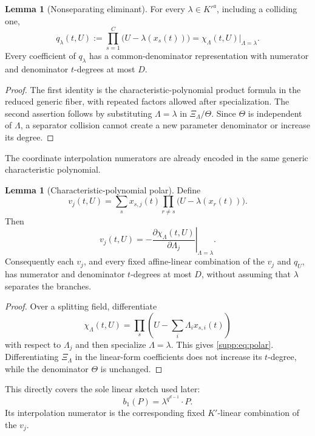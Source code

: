 \documentclass[11pt,a4paper]{article}
\theoremstyle{definition}
\newtheorem{lemma}[theorem]{Lemma}
\theoremstyle{remark}
\begin{document}
\begin{lemma}[Nonseparating eliminant]\label{supp:lem:charpoly}
For every $\lambda\in K'^a$, including a colliding one,
\[
 q_\lambda(t,U)
 :=\prod_{s=1}^{C}\bigl(U-\lambda(x_s(t))\bigr)
 =\chi_\Lambda(t,U)\big|_{\Lambda=\lambda}.
\]
Every coefficient of $q_\lambda$ has a common-denominator representation with numerator and denominator $t$-degrees at most $D$.
\end{lemma}

\begin{proof}
The first identity is the characteristic-polynomial product formula in the reduced generic fiber, with repeated factors allowed after specialization.  The second assertion follows by substituting $\Lambda=\lambda$ in $\Xi_\Lambda/\Theta$.  Since $\Theta$ is independent of $\Lambda$, a separator collision cannot create a new parameter denominator or increase its degree.
\end{proof}

The coordinate interpolation numerators are already encoded in the same generic characteristic polynomial.

\begin{lemma}[Characteristic-polynomial polar]\label{supp:lem:polar}
Define
\[
 v_j(t,U)=\sum_s x_{s,j}(t)
       \prod_{r\ne s}\bigl(U-\lambda(x_r(t))\bigr).
\]
Then
\begin{equation}\label{supp:eq:polar}
 v_j(t,U)
 =-\left.\frac{\partial\chi_\Lambda(t,U)}{\partial\Lambda_j}
   \right|_{\Lambda=\lambda}.
\end{equation}
Consequently each $v_j$, and every fixed affine-linear combination of the $v_j$ and $q_U$, has numerator and denominator $t$-degrees at most $D$, without assuming that $\lambda$ separates the branches.
\end{lemma}

\begin{proof}
Over a splitting field, differentiate
\[
 \chi_\Lambda(t,U)=\prod_s\left(U-\sum_i\Lambda_i x_{s,i}(t)\right)
\]
with respect to $\Lambda_j$ and then specialize $\Lambda=\lambda$.  This gives \eqref{supp:eq:polar}.  Differentiating $\Xi_\Lambda$ in the linear-form coefficients does not increase its $t$-degree, while the denominator $\Theta$ is unchanged.
\end{proof}

This directly covers the sole linear sketch used later:
\[
 b_1(P)=\lambda^{q^{d-1}}\!\cdot P.
\]
Its interpolation numerator is the corresponding fixed $K'$-linear combination of the $v_j$.
\end{document}
